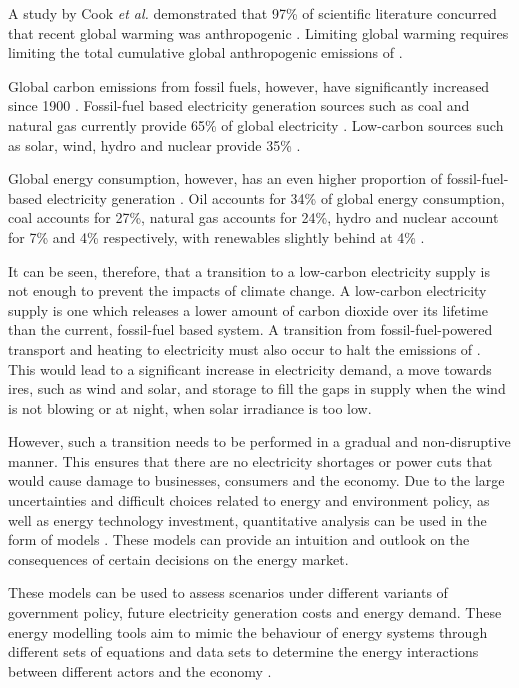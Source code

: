A study by Cook \textit{et al.} demonstrated that 97\% of scientific literature concurred that recent global warming was anthropogenic \cite{Cook2013}. Limiting global warming requires limiting the total cumulative global anthropogenic emissions of  \cite{Masson-Delmotte2018}. 

Global carbon emissions from fossil fuels, however, have significantly increased since 1900 \cite{boden2017global}.    Fossil-fuel based electricity generation sources such as coal and natural gas currently provide 65\% of global electricity \cite{BP2018}. Low-carbon sources such as solar, wind, hydro and nuclear provide 35\% \cite{BP2018}. 

Global energy consumption, however, has an even higher proportion of fossil-fuel-based electricity generation \cite{BPReview}. Oil accounts for 34\% of global energy consumption, coal accounts for 27\%, natural gas accounts for 24\%, hydro and nuclear account for 7\% and 4\% respectively, with renewables slightly behind at 4\% \cite{BP2018}. 

It can be seen, therefore, that a transition to a low-carbon electricity supply is not enough to prevent the impacts of climate change. A low-carbon electricity supply is one which releases a lower amount of carbon dioxide over its lifetime than the current, fossil-fuel based system. A transition from fossil-fuel-powered transport and heating to electricity must also occur to halt the emissions of . This would lead to a significant increase in electricity demand, a move towards \gls{ires}, such as wind and solar, and storage to fill the gaps in supply when the wind is not blowing or at night, when solar irradiance is too low. 

However, such a transition needs to be performed in a gradual and non-disruptive manner. This ensures that there are no electricity shortages or power cuts that would cause damage to businesses, consumers and the economy. Due to the large uncertainties and difficult choices related to energy and environment policy, as well as energy technology investment, quantitative analysis can be used in the form of models \cite{DeCarolis2012}. These models can provide an intuition and outlook on the consequences of certain decisions on the energy market.

These models can be used to assess scenarios under different variants of government policy, future electricity generation costs and energy demand. These energy modelling tools aim to mimic the behaviour of energy systems through different sets of equations and data sets to determine the energy interactions between different actors and the economy \cite{Machado2019}.

